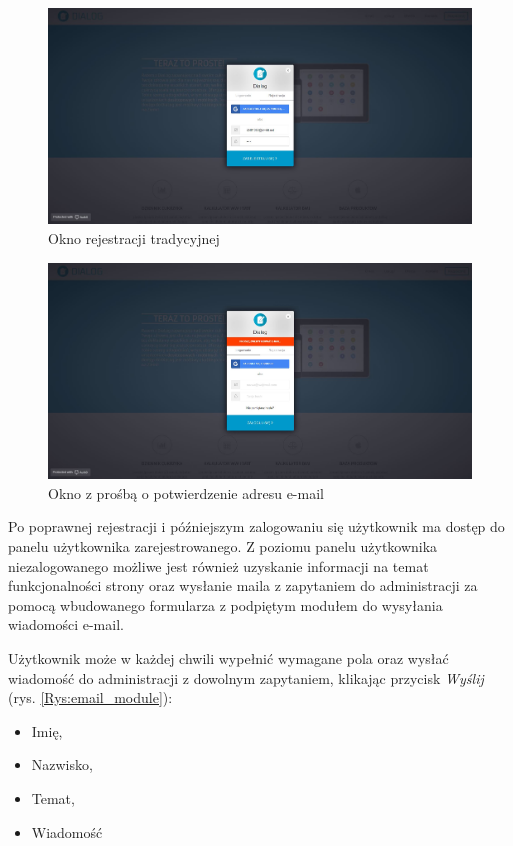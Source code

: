 \newpage

\begin{figure}[h]
	\centering\includegraphics[scale=0.3]{images/normal_registration.jpg}
	\caption{Okno rejestracji tradycyjnej}
	\label{Rys:normal_registration}
\end{figure}

\begin{figure}[h]
	\centering\includegraphics[scale=0.3]{images/email_verify.jpg}
	\caption{Okno z prośbą o potwierdzenie adresu e-mail}
	\label{Rys:email_notification}
\end{figure}

Po poprawnej rejestracji i późniejszym zalogowaniu się użytkownik ma dostęp do panelu użytkownika zarejestrowanego. Z poziomu panelu użytkownika niezalogowanego możliwe jest również uzyskanie informacji na temat funkcjonalności strony oraz wysłanie maila z zapytaniem do administracji za pomocą wbudowanego formularza z podpiętym modułem do wysyłania wiadomości e-mail. 

\newpage

Użytkownik może w każdej chwili wypełnić wymagane pola oraz wysłać wiadomość do administracji z dowolnym zapytaniem, klikając przycisk \textit{Wyślij} (rys. \ref{Rys:email_module}):
\begin{itemize}
	\item Imię,
	\item Nazwisko,
	\item Temat,
	\item Wiadomość
\end{itemize}

